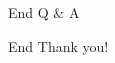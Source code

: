 \begin{frame}{End}
    \centering
    \Huge {Q \& A}
\end{frame}

\begin{frame}{End}
    \centering
    \Huge {Thank you!}
\end{frame}

